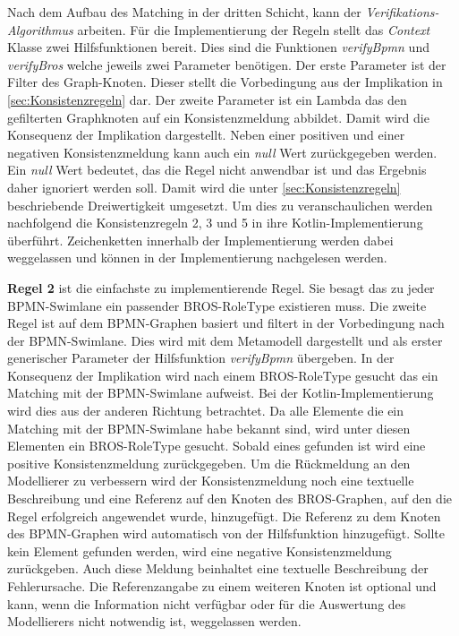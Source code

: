 Nach dem Aufbau des Matching in der dritten Schicht, kann der \emph{Verifikations-Algorithmus} arbeiten.
Für die Implementierung der Regeln stellt das \emph{Context} Klasse zwei Hilfsfunktionen bereit.
Dies sind die Funktionen \emph{verifyBpmn} und \emph{verifyBros} welche jeweils zwei Parameter benötigen.
Der erste Parameter ist der Filter des Graph-Knoten.
Dieser stellt die Vorbedingung aus der Implikation in \cref{sec:Konsistenzregeln} dar.
Der zweite Parameter ist ein Lambda das den gefilterten Graphknoten auf ein Konsistenzmeldung abbildet.
Damit wird die Konsequenz der Implikation dargestellt.
Neben einer positiven und einer negativen Konsistenzmeldung kann auch ein \emph{null} Wert zurückgegeben werden.
Ein \emph{null} Wert bedeutet, das die Regel nicht anwendbar ist und das Ergebnis daher ignoriert werden soll.
Damit wird die unter \cref{sec:Konsistenzregeln} beschriebende Dreiwertigkeit umgesetzt.
Um dies zu veranschaulichen werden nachfolgend die Konsistenzregeln 2, 3 und 5 in ihre Kotlin-Implementierung überführt.
Zeichenketten innerhalb der Implementierung werden dabei weggelassen und können in der Implementierung nachgelesen werden.

\textbf{Regel 2} ist die einfachste zu implementierende Regel.
Sie besagt das zu jeder BPMN-Swimlane ein passender BROS-RoleType existieren muss.
Die zweite Regel ist auf dem BPMN-Graphen basiert und filtert in der Vorbedingung nach der BPMN-Swimlane.
Dies wird mit dem Metamodell dargestellt und als erster generischer Parameter der Hilfsfunktion \emph{verifyBpmn} übergeben.
In der Konsequenz der Implikation wird nach einem BROS-RoleType gesucht das ein Matching mit der BPMN-Swimlane aufweist.
Bei der Kotlin-Implementierung wird dies aus der anderen Richtung betrachtet.
Da alle Elemente die ein Matching mit der BPMN-Swimlane habe bekannt sind, wird unter diesen Elementen ein BROS-RoleType gesucht.
Sobald eines gefunden ist wird eine positive Konsistenzmeldung zurückgegeben.
Um die Rückmeldung an den Modellierer zu verbessern wird der Konsistenzmeldung noch eine textuelle Beschreibung und eine Referenz auf den Knoten des BROS-Graphen, auf den die Regel erfolgreich angewendet wurde, hinzugefügt.
Die Referenz zu dem Knoten des BPMN-Graphen wird automatisch von der Hilfsfunktion hinzugefügt.
Sollte kein Element gefunden werden, wird eine negative Konsistenzmeldung zurückgeben.
Auch diese Meldung beinhaltet eine textuelle Beschreibung der Fehlerursache.
Die Referenzangabe zu einem weiteren Knoten ist optional und kann, wenn die Information nicht verfügbar oder für die Auswertung des Modellierers nicht notwendig ist, weggelassen werden.


